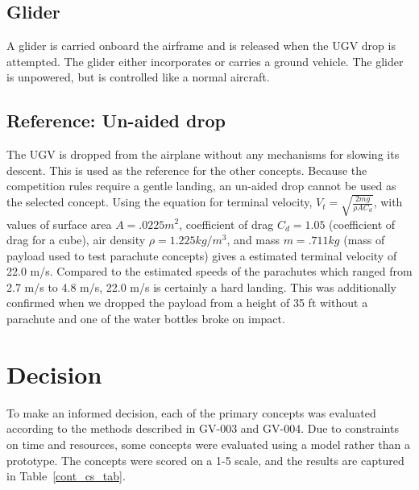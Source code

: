 \documentclass[]{auvsi_doc}
\begin{document}
\subsection{Glider}
A glider is carried onboard the airframe and is released when the UGV drop is attempted. The glider either incorporates or carries a ground vehicle. The glider is unpowered, but is controlled like a normal aircraft. 

\subsection{Reference: Un-aided drop} 
The UGV is dropped from the airplane without any mechanisms for slowing its descent. This is used as the reference for the other concepts. Because the competition rules require a gentle landing, an un-aided drop cannot be used as the selected concept. Using the equation for terminal velocity, $V_t = \sqrt{\frac{2mg}{\rho A C_d}}$, with values of  surface area $A = .0225 m^2$, coefficient of drag $C_d = 1.05$ (coefficient of drag for a cube), air density $\rho = 1.225 kg/m^3$, and mass $m = .711 kg$ (mass of payload used to test parachute concepts) gives a estimated terminal velocity of 22.0 m/s. Compared to the estimated speeds of the parachutes which ranged from 2.7 m/s to 4.8 m/s, 22.0 m/s is certainly a hard landing. This was additionally confirmed when we dropped the payload from a height of 35 ft without a parachute and one of the water bottles broke on impact.

\section{Decision}
To make an informed decision, each of the primary concepts was evaluated according to the methods described in GV-003 and GV-004. 
Due to constraints on time and resources, some concepts were evaluated using a model rather than a prototype. 
The concepts were scored on a 1-5 scale, and the results are captured in Table~\ref{cont_cs_tab}.
\end{document}
